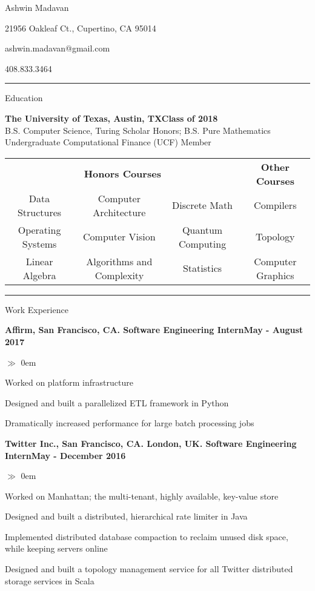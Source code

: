 \documentclass{article}
\begin{document}

\centerline{\LARGE \sc Ashwin Madavan}
\centerline{21956 Oakleaf Ct., Cupertino, CA 95014}
\centerline{ashwin.madavan@gmail.com}
\centerline{408.833.3464}
\medskip\hrule\medskip

\centerline{\large \sc Education}\smallskip \noindent\textbf{The University
of Texas, Austin, TX\hfill{Class of 2018}} \\
B.S. Computer Science, Turing Scholar Honors; B.S. Pure Mathematics \\
Undergraduate Computational Finance (UCF) Member

\begin{center}
\begin{tabular} { c c c c }
\multicolumn{3}{c}{\textbf{Honors Courses}} &
\multicolumn{1}{c}{\textbf{Other Courses}} \\
Data Structures & Computer Architecture & Discrete Math & Compilers \\
Operating Systems & Computer Vision & Quantum Computing & Topology \\
Linear Algebra & Algorithms and Complexity & Statistics & Computer Graphics \\

\end{tabular}
\end{center}
\hrule\medskip

\centerline{\large \sc Work Experience} \smallskip
\noindent\textbf{Affirm, San Francisco, CA. Software Engineering
Intern\hfill{May - August 2017}}
\begin{list}{$\gg$}{}  
  \itemsep0em
  \item Worked on platform infrastructure
  \item Designed and built a parallelized ETL framework in Python
  \item Dramatically increased performance for large batch processing jobs
\end{list}

\noindent\textbf{Twitter Inc., San Francisco, CA. London, UK. Software Engineering
Intern\hfill{May - December 2016}}
\begin{list}{$\gg$}{}  
  \itemsep0em
  \item Worked on Manhattan; the multi-tenant, highly available, key-value store
  \item Designed and built a distributed, hierarchical rate limiter in Java
  \item Implemented distributed database compaction to reclaim unused disk space, while keeping servers online
  \item Designed and built a topology management service for all Twitter distributed storage services in Scala
\end{list}
\end{document}
